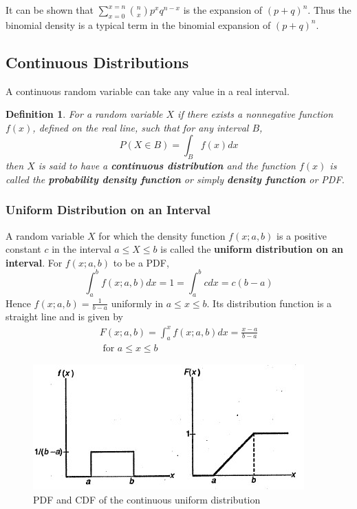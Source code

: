 \documentclass{article}
\newtheorem{definition}{Definition}[section]
\begin{document}
It can be shown that \( \sum_{x=0}^{x=n} \binom{n}{x} p^x q^{n-x}\) is the expansion of \((p+q)^n\). Thus the binomial density is a typical term in the binomial expansion of \((p+q)^n\).

\subsection{Continuous Distributions}

A continuous random variable can take any value in a real interval.

\begin{definition}
    For a random variable \(X\) if there exists a nonnegative function \(f(x)\), defined on the real line, such that for any interval \(B\),
    \begin{equation*}
        P(X \in B)= \int_{B} f(x) dx
    \end{equation*}
    then \(X\) is said to have a \textbf{continuous distribution} and the function \(f(x)\) is called the \textbf{probability density function} or simply \textbf{density function} or PDF.
\end{definition}

\subsubsection{Uniform Distribution on an Interval}

A random variable \(X\) for which the density function \(f(x;a,b)\) is a positive constant \(c\) in the interval \(a \leq X \leq b\) is called the \textbf{uniform distribution on an interval}. For \(f(x;a,b)\) to be a PDF,
\begin{equation*}
    \int_{a}^{b} f(x; a,b) dx = 1 = \int_{a}^{b} c dx = c(b-a)
\end{equation*}
Hence \(f(x; a,b)=\frac{1}{b-a}\) uniformly in \(a \leq x \leq b\). Its distribution function is a straight line and is given by
\begin{equation*}
\begin{split}
    F(x; a,b)= \int_{a}^{x} f(x; a,b) dx = \frac{x-a}{b-a}\\
    \text{ for } a \leq x \leq b
\end{split}
\end{equation*}

\begin{figure} [H]
    \centering
    \includegraphics{pics/cdf Pdf.jpg}
    \caption{PDF and CDF of the continuous uniform distribution}
    \label{cdfpdf}
\end{figure}
\end{document}
